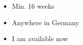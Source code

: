 


\twocolumnsection
{
	\begin{skills}
	\end{skills}
}
{
	\vspace{1ex}
	\begin{itemize}
		\item Min. 16 weeks  
		\item Anywhere in Germany          
		\item I am available now
	\end{itemize}
}

